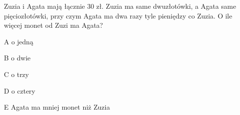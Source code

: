 \begin{tresc}
Zuzia i Agata mają łącznie 30 zł. Zuzia ma same dwuzłotówki, a Agata same pięciozłotówki, przy czym Agata ma dwa razy tyle pieniędzy co Zuzia. O ile więcej monet od Zuzi ma Agata?
\end{tresc}
\begin{wariant}{A} o jedną \end{wariant}
\begin{wariant}{B} o dwie \end{wariant}
\begin{wariant}{C} o trzy \end{wariant}
\begin{wariant}{D} o cztery \end{wariant}
\begin{wariant}{E} Agata ma mniej monet niż Zuzia \end{wariant}
